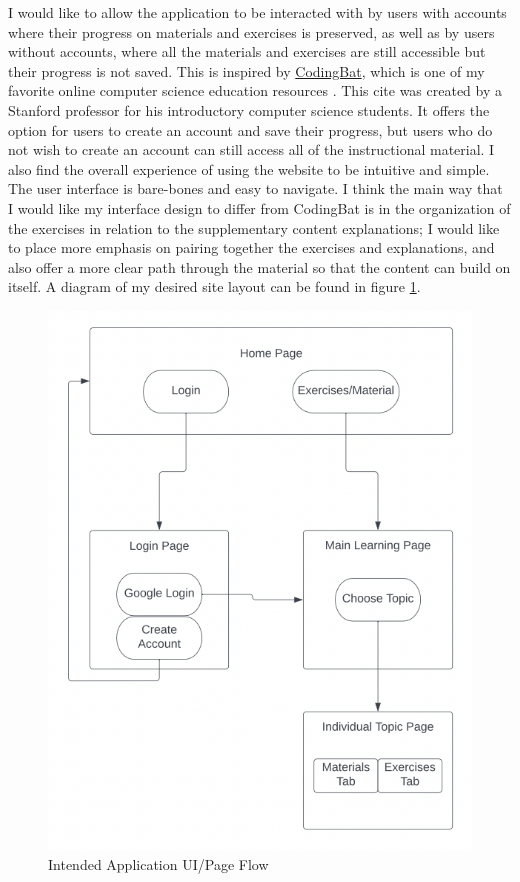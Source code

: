 \documentclass[10pt,twocolumn]{article}
\begin{document}
I would like to allow the application to be interacted with by users with accounts where their progress on materials and
exercises is preserved, as well as by users without accounts, where all the materials and exercises are still accessible 
but their progress is not saved. This is inspired by \href{https://codingbat.com/java}{CodingBat}, which is one of my favorite online computer science 
education resources \cite{CodingBat}. This cite was created by a Stanford professor for his introductory computer 
science students. It offers the option for users to create an account and save their progress, but users who do not wish 
to create an account can still access all of the instructional material. I also find the overall experience of using the 
website to be intuitive and simple. The user interface is bare-bones and easy to navigate. I think the main way 
that I would like my interface design to differ from CodingBat is in the organization of the exercises in relation to 
the supplementary content explanations; I would like to place more emphasis on pairing together the exercises and 
explanations, and also offer a more clear path through the material so that the content can build on itself. A diagram 
of my desired site layout can be found in figure \ref{UI-flow-diagram}.

\begin{figure}[!ht]
    \includegraphics[scale=.7]{./images/UI-Flow-Diagram}
    \caption{Intended Application UI/Page Flow}
    \label{UI-flow-diagram}
\end{figure}
\end{document}

